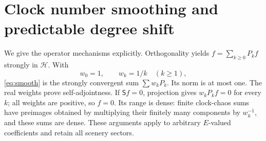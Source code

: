 \documentclass[11pt]{article}
\newcommand{\HH}{\mathcal H}
\newcommand{\Smo}{\mathsf S}
\begin{document}
\section{Clock number smoothing and predictable degree shift}
We give the operator mechanisms explicitly. Orthogonality yields
$f=\sum_{k\geq0}P_kf$ strongly in $\HH$. With
\[
 w_0=1,\qquad w_k=1/k\quad(k\geq1),
\]
\eqref{eq:smooth} is the strongly convergent sum $\sum w_kP_k$.
Its norm is at most one. The real weights prove self-adjointness.
If $\Smo f=0$, projection gives $w_kP_kf=0$ for every $k$;
all weights are positive, so $f=0$. Its range is dense: finite
clock-chaos sums have preimages obtained by multiplying their
finitely many components by $w_k^{-1}$, and these sums are dense.
These arguments apply to arbitrary $E$-valued coefficients and
retain all scenery sectors.
\end{document}
